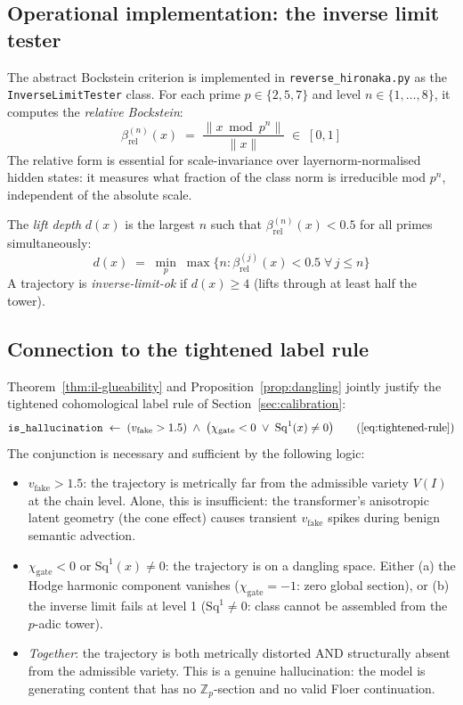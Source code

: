 \documentclass[11pt,a4paper]{article}
\begin{document}
\subsection{Operational implementation: the inverse limit tester}

The abstract Bockstein criterion is implemented in
\texttt{reverse\_hironaka.py} as the \texttt{InverseLimitTester}
class.
For each prime $p \in \{2,5,7\}$ and level $n \in \{1,\ldots,8\}$,
it computes the \emph{relative Bockstein}:
\[
  \beta^{(n)}_{\mathrm{rel}}(x) \;=\;
  \frac{\bigl\| x \bmod p^n \bigr\|}{\|x\|}
  \;\in\; [0,1]
\]
The relative form is essential for scale-invariance over
layernorm-normalised hidden states: it measures what fraction
of the class norm is irreducible mod $p^n$, independent of the
absolute scale.

The \emph{lift depth} $d(x)$ is the largest $n$ such that
$\beta^{(n)}_{\mathrm{rel}}(x) < 0.5$ for all primes simultaneously:
\[
  d(x) \;=\; \min_p \;\max\bigl\{n : \beta^{(j)}_{\mathrm{rel}}(x) < 0.5
              \;\forall\, j \leq n\bigr\}
\]
A trajectory is \emph{inverse-limit-ok} if $d(x) \geq 4$
(lifts through at least half the tower).

\subsection{Connection to the tightened label rule}

Theorem~\ref{thm:il-glueability} and Proposition~\ref{prop:dangling}
jointly justify the tightened cohomological label rule of
Section~\ref{sec:calibration}:
\begin{equation}
  \texttt{is\_hallucination}
  \;\leftarrow\;
  (v_{\text{fake}} > 1.5)
  \;\wedge\;
  \bigl(\chi_{\text{gate}} < 0
        \;\vee\;
        \mathrm{Sq}^1(x) \neq 0\bigr)
  \tag{\ref{eq:tightened-rule}}
\end{equation}
The conjunction is necessary and sufficient by the following logic:
\begin{itemize}
  \item $v_{\text{fake}} > 1.5$: the trajectory is metrically far
        from the admissible variety $V(I)$ at the chain level.
        Alone, this is insufficient: the transformer's anisotropic
        latent geometry (the cone effect) causes transient
        $v_{\text{fake}}$ spikes during benign semantic advection.
  \item $\chi_{\text{gate}} < 0$ or $\mathrm{Sq}^1(x) \neq 0$:
        the trajectory is on a dangling space.
        Either (a) the Hodge harmonic component vanishes
        ($\chi_{\text{gate}} = -1$: zero global section),
        or (b) the inverse limit fails at level 1
        ($\mathrm{Sq}^1 \neq 0$: class cannot be assembled from
        the $p$-adic tower).
  \item \emph{Together}: the trajectory is both metrically
        distorted AND structurally absent from the admissible
        variety. This is a genuine hallucination: the model is
        generating content that has no $\mathbb{Z}_p$-section
        and no valid Floer continuation.
\end{itemize}
\end{document}
